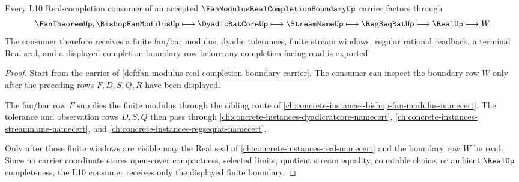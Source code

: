 \begin{theorem}
\label{thm:fan-modulus-real-completion-boundary-l10-consumption}
Every L10 Real-completion consumer of an accepted $\FanModulusRealCompletionBoundaryUp$ carrier factors through
$$
\FanTheoremUp,\BishopFanModulusUp \longmapsto \DyadicRatCoreUp \longmapsto \StreamNameUp \longmapsto \RegSeqRatUp \longmapsto \RealUp \longmapsto W .
$$
The consumer therefore receives a finite fan/bar modulus, dyadic tolerances, finite stream windows, regular rational readback, a terminal Real seal, and a displayed completion boundary row before any completion-facing read is exported.
\end{theorem}
\begin{proof}
Start from the carrier of \autoref{def:fan-modulus-real-completion-boundary-carrier}. The consumer can inspect the boundary row $W$ only after the preceding rows $F,D,S,Q,R$ have been displayed.

The fan/bar row $F$ supplies the finite modulus through the sibling route of \autoref{ch:concrete-instances-bishop-fan-modulus-namecert}. The tolerance and observation rows $D,S,Q$ then pass through \autoref{ch:concrete-instances-dyadicratcore-namecert}, \autoref{ch:concrete-instances-streamname-namecert}, and \autoref{ch:concrete-instances-regseqrat-namecert}.

Only after those finite windows are visible may the Real seal of \autoref{ch:concrete-instances-real-namecert} and the boundary row $W$ be read. Since no carrier coordinate stores open-cover compactness, selected limits, quotient stream equality, countable choice, or ambient $\RealUp$ completeness, the L10 consumer receives only the displayed finite boundary.
\end{proof}



